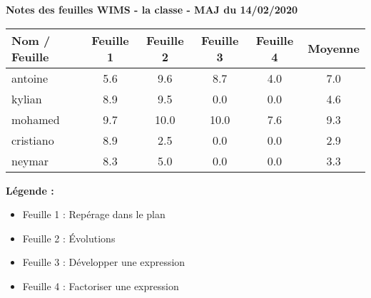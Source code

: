 \documentclass[12pt,a4paper]{article}
\begin{document}
\thispagestyle{empty}
\large
\begin{center}
\textbf{Notes des feuilles WIMS - la classe - MAJ du 14/02/2020}
\end{center}

\begin{center} 
\begin{tabular}{|l|*{5}{c|}} 
\hline 
\textbf{Nom / Feuille} & Feuille 1 & Feuille 2 & Feuille 3 & Feuille 4 & {\color{red} Moyenne } \\ 
\hline 
antoine & 5.6 & 9.6 & 8.7 & 4.0 & { \color{red} 7.0 } \\ 
\hline 
kylian & 8.9 & 9.5 & 0.0 & 0.0 & { \color{red} 4.6 } \\ 
\hline 
mohamed & 9.7 & 10.0 & 10.0 & 7.6 & { \color{red} 9.3 } \\ 
\hline 
cristiano & 8.9 & 2.5 & 0.0 & 0.0 & { \color{red} 2.9 } \\ 
\hline 
neymar & 8.3 & 5.0 & 0.0 & 0.0 & { \color{red} 3.3 } \\ 
\hline 
\end{tabular} 
\end{center} 
 
\textbf{{Légende : }} 
\begin{itemize} 
 \item Feuille 1 : Repérage dans le plan 
 \item Feuille 2 : Évolutions 
 \item Feuille 3 : Développer une expression 
 \item Feuille 4 : Factoriser une expression 
\end{itemize}
\end{document}
